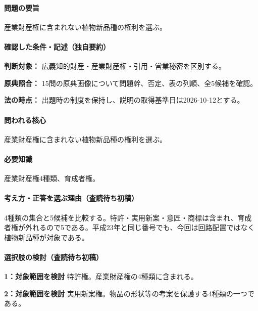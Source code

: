 \paragraph{問題の要旨} 産業財産権に含まれない植物新品種の権利を選ぶ。

\paragraph{確認した条件・記述（独自要約）}\mbox{}\par

\noindent\textbf{判断対象：} 広義知的財産・産業財産権・引用・営業秘密を区別する。\par

\noindent\textbf{原典照合：} 15問の原典画像について問題幹、否定、表の列順、全5候補を確認。\par

\noindent\textbf{法の時点：} 出題時の制度を保持し、説明の取得基準日は2026-10-12とする。\par

\paragraph{問われる核心} 産業財産権に含まれない植物新品種の権利を選ぶ。

\paragraph{必要知識} 産業財産権4種類、育成者権。

\paragraph{考え方・正答を選ぶ理由（査読待ち初稿）} 4種類の集合と5候補を比較する。特許・実用新案・意匠・商標は含まれ、育成者権が外れるので5である。平成23年と同じ番号でも、今回は回路配置ではなく植物新品種が対象である。

\paragraph{選択肢の検討（査読待ち初稿）}\mbox{}\par

\noindent\textbf{1：対象範囲を検討} 特許権。産業財産権の4種類に含まれる。\par

\noindent\textbf{2：対象範囲を検討} 実用新案権。物品の形状等の考案を保護する4種類の一つである。\par

